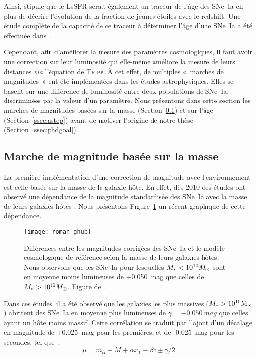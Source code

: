 \documentclass[../main/main.tex]{subfiles}
\begin{document}
Ainsi, \cite{rigault2020} stipule que le LsSFR serait également un traceur de
l'âge des SNe~Ia en plus de décrire l'évolution de la fraction de jeunes étoiles
avec le redshift. Une étude complète de la capacité de ce traceur à déterminer
l'âge d'une SNe~Ia a été effectuée dans~\cite{briday2021, briday2022}.

Cependant, afin d'améliorer la mesure des paramètres cosmologiques, il faut
avoir une correction sur leur luminosité qui elle-même améliore la mesure de
leurs distances \textit{via} l'équation de \textsc{Tripp}. À cet effet, de
multiples «~marches de magnitudes~» ont été implémentées dans les études
astrophysiques. Elles se basent sur une différence de luminosité entre deux
populations de SNe~Ia, discriminées par la valeur d'un paramètre. Nous
présentons dans cette section les marches de magnitudes basées sur la masse
(Section~\ref{ssec:mstep}) et sur l'âge (Section~\ref{ssec:astep}) avant de
motiver l'origine de notre thèse (Section~\ref{ssec:phdgoal}).

\subsection{Marche de magnitude basée sur la masse}\label{ssec:mstep}

La première implémentation d'une correction de magnitude avec l'environnement
est celle basée sur la masse de la galaxie hôte. En effet, dès 2010 des études
ont observé une dépendance de la magnitude standardisée des SNe~Ia avec la masse
de leurs galaxies hôtes \citep[voir par exemple][]{kelly2010, betoule2014}. Nous
présentons Figure~\ref{fig:mbmass} un récent graphique de cette dépendance.

\begin{figure}[htb]
    \centering
    \texttt{[image: roman\_ghub]}
    \caption[Marche de magnitude basée sur la masse]{Différences entre les
        magnitudes corrigées des SNe~Ia et le modèle cosmologique de référence
        selon la masse de leurs galaxies hôtes. Nous observons que les SNe~Ia
        pour lesquelles $M_* < 10^{10}\Msun$ sont en moyenne moins lumineuses de
        +\SI{0.050}{mag} que celles de $M_* > 10^{10}\Msun$. Figure
    de~\cite{roman2018}.}
    \label{fig:mbmass}
\end{figure}

Dans ces études, il a été observé que les galaxies les plus
massives ($M_* > 10^{10}\si{\Msun}$) abritent des SNe~Ia en moyenne plus
lumineuses de $\gamma = -\SI{0.050}{mag}$ que celles ayant un hôte moins massif.
Cette corrélation se traduit par l'ajout d'un décalage en magnitude de
+\SI{0.025}{mag} pour les premières, et de -\SI{0.025}{mag} pour les secondes,
tel que~:
\begin{equation}\label{eq:mbmass}
    \mu = m_B - M + \alpha x_1 - \beta c \pm \gamma/2
\end{equation}
\end{document}

